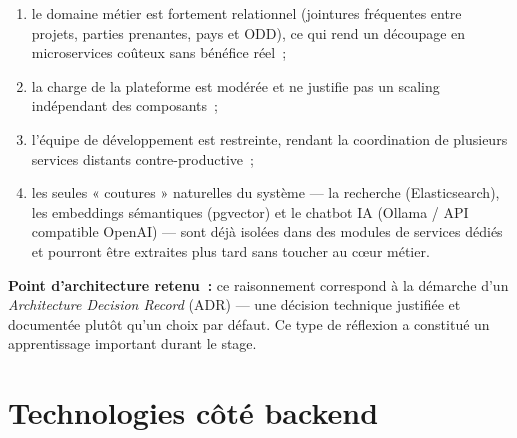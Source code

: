 \documentclass[11pt,a4paper]{report}
\begin{document}
\begin{enumerate}
  \item le domaine métier est fortement relationnel (jointures fréquentes entre projets, parties prenantes,
    pays et ODD), ce qui rend un découpage en microservices coûteux sans bénéfice réel~;
  \item la charge de la plateforme est modérée et ne justifie pas un scaling indépendant des composants~;
  \item l'équipe de développement est restreinte, rendant la coordination de plusieurs services distants
    contre-productive~;
  \item les seules « coutures » naturelles du système — la recherche (Elasticsearch), les embeddings
    sémantiques (pgvector) et le chatbot IA (Ollama / API compatible OpenAI) — sont déjà isolées dans des
    modules de services dédiés et pourront être extraites plus tard sans toucher au cœur métier.
\end{enumerate}

\begin{infobox}
\textbf{Point d'architecture retenu~:} ce raisonnement correspond à la démarche d'un \emph{Architecture
Decision Record} (ADR) — une décision technique justifiée et documentée plutôt qu'un choix par défaut. Ce
type de réflexion a constitué un apprentissage important durant le stage.
\end{infobox}

\section{Technologies côté backend}
\end{document}
